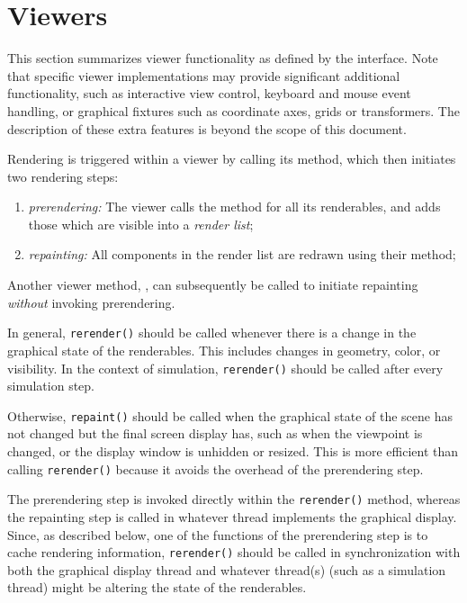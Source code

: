 \section{Viewers}
\label{viewers:sec}

This section summarizes viewer functionality as defined by the
 interface. Note that specific
viewer implementations may provide significant additional
functionality, such as interactive view control, keyboard and mouse
event handling, or graphical fixtures such as coordinate axes, grids
or transformers. The description of these extra features is beyond the
scope of this document.

Rendering is triggered within a viewer by calling its
 method, which
then initiates two rendering steps:

\begin{enumerate}

\item {\it prerendering:} The viewer calls the
method for all its renderables, and adds those which
are visible into a {\it render list};

\item {\it repainting:} All components in the render list
are redrawn using their
 method;

\end{enumerate}

Another viewer method, ,
can subsequently be called to initiate repainting {\it without}
invoking prerendering.  

In general, {\tt rerender()} should be called whenever there is a
change in the graphical state of the renderables. This includes
changes in geometry, color, or visibility.  In the context of
simulation, {\tt rerender()} should be called after every simulation
step.

Otherwise, {\tt repaint()} should be called when the graphical state
of the scene has not changed but the final screen display has, such as
when the viewpoint is changed, or the display window is unhidden or
resized. This is more efficient than calling {\tt rerender()} because
it avoids the overhead of the prerendering step.

The prerendering step is invoked directly within the {\tt rerender()}
method, whereas the repainting step is called in whatever thread
implements the graphical display. Since, as described below, one of
the functions of the prerendering step is to cache rendering
information, {\tt rerender()} should be called in synchronization with both the
graphical display thread and whatever thread(s) (such as a simulation
thread) might be altering the state of the renderables.

